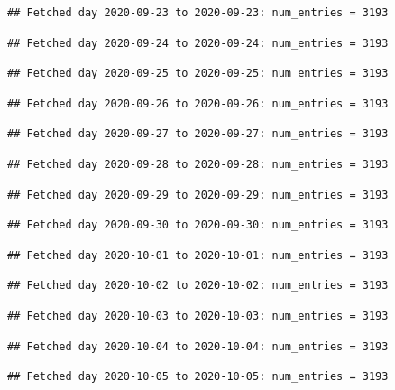 \documentclass[]{article}
\begin{document}
\begin{verbatim}
## Fetched day 2020-09-23 to 2020-09-23: num_entries = 3193
\end{verbatim}

\begin{verbatim}
## Fetched day 2020-09-24 to 2020-09-24: num_entries = 3193
\end{verbatim}

\begin{verbatim}
## Fetched day 2020-09-25 to 2020-09-25: num_entries = 3193
\end{verbatim}

\begin{verbatim}
## Fetched day 2020-09-26 to 2020-09-26: num_entries = 3193
\end{verbatim}

\begin{verbatim}
## Fetched day 2020-09-27 to 2020-09-27: num_entries = 3193
\end{verbatim}

\begin{verbatim}
## Fetched day 2020-09-28 to 2020-09-28: num_entries = 3193
\end{verbatim}

\begin{verbatim}
## Fetched day 2020-09-29 to 2020-09-29: num_entries = 3193
\end{verbatim}

\begin{verbatim}
## Fetched day 2020-09-30 to 2020-09-30: num_entries = 3193
\end{verbatim}

\begin{verbatim}
## Fetched day 2020-10-01 to 2020-10-01: num_entries = 3193
\end{verbatim}

\begin{verbatim}
## Fetched day 2020-10-02 to 2020-10-02: num_entries = 3193
\end{verbatim}

\begin{verbatim}
## Fetched day 2020-10-03 to 2020-10-03: num_entries = 3193
\end{verbatim}

\begin{verbatim}
## Fetched day 2020-10-04 to 2020-10-04: num_entries = 3193
\end{verbatim}

\begin{verbatim}
## Fetched day 2020-10-05 to 2020-10-05: num_entries = 3193
\end{verbatim}
\end{document}
